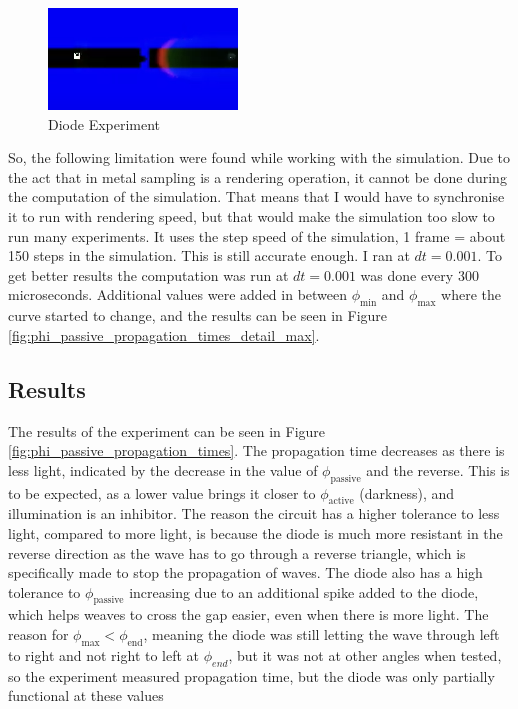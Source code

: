 \begin{figure}
    \centering
    \includegraphics[width=0.5\linewidth]{diode.png}
    \caption{Diode Experiment}
    \label{fig:diode_experiment}
\end{figure}

So, the following limitation were found while working with the simulation. Due to the act that in metal sampling is a rendering operation, it cannot be done during the computation of the simulation. That means that I would have to synchronise it to run with rendering speed, but that would make the simulation too slow to run many experiments. It uses the step speed of the simulation, 1 frame = about 150 steps in the simulation. This is still accurate enough. I ran at $dt=0.001$.
To get better results the computation was run at $dt=0.001$ was done every 300 microseconds.
Additional values were added in between $\phi_{\text{min}}$ and $\phi_{\text{max}}$ where the curve started to change, and the results can be seen in Figure \ref{fig:phi_passive_propagation_times_detail_max}.

\subsection{Results}

The results of the experiment can be seen in Figure \ref{fig:phi_passive_propagation_times}. The propagation time decreases as there is less light, indicated by the decrease in the value of $\phi_{\text{passive}}$ and the reverse. This is to be expected, as a lower value brings it closer to $\phi_{\text{active}}$ (darkness), and illumination is an inhibitor. 
The reason the circuit has a higher tolerance to less light, compared to more light, is because the diode is much more resistant in the reverse direction as the wave has to go through a reverse triangle, 
which is specifically made to stop the propagation of waves. 
The diode also has a high tolerance to $\phi_{\text{passive}}$ increasing due to an additional spike added to the diode, which helps weaves to cross the gap easier, even when there is more light. The reason for $\phi_{\text{max}} < \phi_{\text{end}}$, meaning the diode was still letting the wave through left to right and not right to left at $\phi_{end}$, but it was not at other angles when tested, so the experiment measured propagation time, but the diode was only partially functional at these values


